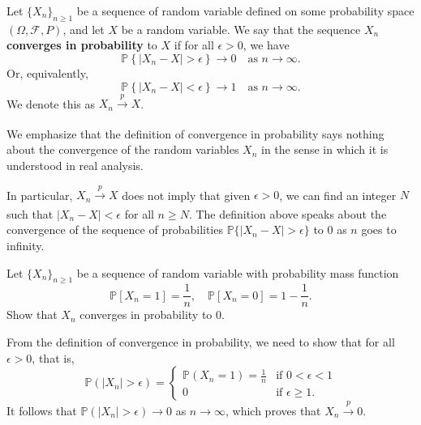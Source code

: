 \begin{definition}
    Let $\{X_n\}_{n \geq 1}$ be a sequence of random variable defined on some probability space 
    $(\Omega, \mathscr{F}, P)$, and let $X$ be a random variable. We say that the sequence
    $X_n$ \textbf{converges in probability} to $X$ if for all $\epsilon > 0$, we have 
    \begin{equation}
        \mathbb{P} \left\{ |X_n - X| > \epsilon \right\} \to 0 \quad \text{as } n \to \infty.
    \end{equation}
    Or, equivalently,
    \begin{equation}
        \mathbb{P} \left\{ |X_n - X| < \epsilon \right\} \to 1 \quad \text{as } n \to \infty.
    \end{equation}
    We denote this as $X_n \xrightarrow[]{p} X$.
\end{definition}
\begin{remark}
    We emphasize that the definition of convergence in probability says nothing about the convergence of the random variables
    $X_n$ in the sense in which it is understood in real analysis.

    In particular, $X_n \xrightarrow[]{p} X$ does not imply that given $\epsilon > 0$, we can find an integer 
    $N$ such that $|X_n - X| < \epsilon$ for all $n \geq N$. The definition above speaks about the 
    convergence of the sequence of probabilities $\mathbb{P}\{|X_n - X| > \epsilon\}$ to 0 as $n$ goes to infinity.
\end{remark}

\begin{example}
    Let $\{X_n\}_{n \geq 1}$ be a sequence of random variable with probability mass function
    \[
        \mathbb{P}[X_n = 1] = \frac{1}{n}, \quad \mathbb{P}[X_n = 0] = 1 - \frac{1}{n}.
    \]
    Show that $X_n$ converges in probability to 0.
\end{example}
\begin{solution}
    From the definition of convergence in probability, we need to show that for all $\epsilon > 0$, that is,
    \[
        \mathbb{P} \left( |X_n| > \epsilon \right) = \begin{cases}
            \mathbb{P}(X_n = 1) = \frac{1}{n} & \text{if } 0 < \epsilon < 1\\
            0 & \text{if } \epsilon \geq 1.
        \end{cases}
    \]
    It follows that $\mathbb{P} \left( |X_n| > \epsilon \right) \to 0$ as $n \to \infty$, which proves that $X_n \xrightarrow[]{p} 0$.
\end{solution}

